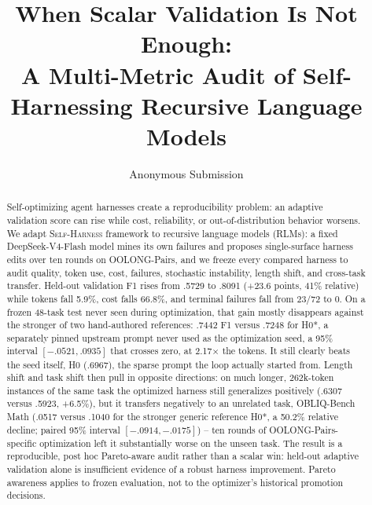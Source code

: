 \documentclass[letterpaper]{article} %
\title{When Scalar Validation Is Not Enough:\\
A Multi-Metric Audit of Self-Harnessing Recursive Language Models}
\author{
    Anonymous Submission
}
\newcommand{\rlms}{\textsc{RLM}s\xspace}
\newcommand{\sh}{\textsc{Self-Harness}\xspace}
\begin{document}
\maketitle

\begin{abstract}
Self-optimizing agent harnesses create a reproducibility problem: an adaptive
validation score can rise while cost, reliability, or out-of-distribution
behavior worsens. We adapt \sh{} framework to recursive language models (\rlms): a fixed
DeepSeek-V4-Flash model mines its own failures and proposes single-surface
harness edits over ten rounds on OOLONG-Pairs, and we freeze every compared
harness to audit quality, token use, cost, failures, stochastic instability,
length shift, and cross-task transfer. Held-out validation F1 rises from .5729
to .8091 (+23.6 points, 41\% relative) while tokens fall 5.9\%, cost falls
66.8\%, and terminal failures fall from 23/72 to 0. On a frozen 48-task test
never seen during optimization, that gain mostly disappears against the
stronger of two hand-authored references: .7442 F1 versus .7248 for H0*, a
separately pinned upstream prompt never used as the optimization seed, a 95\%
interval $[-.0521,.0935]$ that crosses zero, at 2.17$\times$ the tokens. It
still clearly beats the seed itself, H0 (.6967), the sparse prompt the loop
actually started from. Length shift and task shift then pull
in opposite directions: on much longer, 262k-token instances of the same task
the optimized harness still generalizes positively (.6307 versus .5923, +6.5\%),
but it transfers negatively to an unrelated task, OBLIQ-Bench Math (.0517
versus .1040 for the stronger generic reference H0*, a 50.2\% relative decline;
paired 95\% interval $[-.0914,-.0175]$) -- ten rounds of OOLONG-Pairs-specific
optimization left it substantially worse on the unseen task. The result is a
reproducible, post hoc Pareto-aware audit rather than a
scalar win: held-out adaptive validation alone is insufficient evidence of a
robust harness improvement. Pareto awareness applies to frozen evaluation, not
to the optimizer's historical promotion decisions.
\end{abstract}

\end{document}
